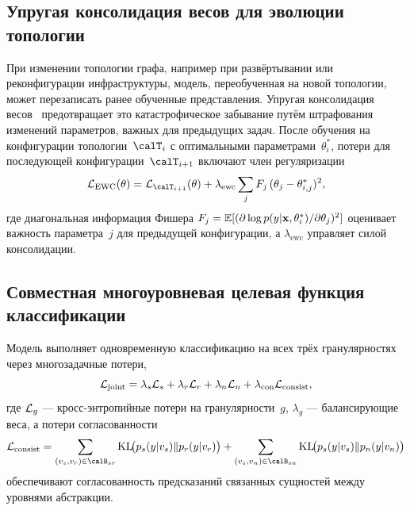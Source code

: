 \subsection{Упругая консолидация весов для эволюции топологии}

При изменении топологии графа, например при развёртывании или реконфигурации инфраструктуры, модель, переобученная на новой топологии, может перезаписать ранее обученные представления. Упругая консолидация весов~\cite{Kirkpatrick2017,Zenke2017} предотвращает это катастрофическое забывание путём штрафования изменений параметров, важных для предыдущих задач. После обучения на конфигурации топологии~$\calT_i$ с оптимальными параметрами~$\theta_i^*$, потери для последующей конфигурации~$\calT_{i+1}$ включают член регуляризации
\begin{equation}
\calL_{\mathrm{EWC}}(\theta)
= \calL_{\calT_{i+1}}(\theta)
  + \lambda_{\mathrm{ewc}}\sum_j F_j\,(\theta_j - \theta_{i,j}^*)^2,
\label{eq:ewc}
\end{equation}
где диагональная информация Фишера $F_j = \mathbb{E}[(\partial\log p(y|\mathbf{x},\theta_i^*)/\partial\theta_j)^2]$ оценивает важность параметра~$j$ для предыдущей конфигурации, а $\lambda_{\mathrm{ewc}}$ управляет силой консолидации.

\subsection{Совместная многоуровневая целевая функция классификации}

Модель выполняет одновременную классификацию на всех трёх гранулярностях через многозадачные потери,
\begin{equation}
\mathcal{L}_{\mathrm{joint}}
= \lambda_s\mathcal{L}_s + \lambda_r\mathcal{L}_r + \lambda_n\mathcal{L}_n
  + \lambda_{\mathrm{con}}\mathcal{L}_{\mathrm{consist}},
\label{eq:triple_joint}
\end{equation}
где $\mathcal{L}_g$ --- кросс-энтропийные потери на гранулярности~$g$, $\lambda_g$ --- балансирующие веса, а потери согласованности
\begin{equation}
\calL_{\mathrm{consist}}
= \sum_{(v_s,v_r)\in\calB_{sr}}
  \mathrm{KL}\!\bigl(p_s(y|v_s)\|p_r(y|v_r)\bigr)
+ \sum_{(v_s,v_n)\in\calB_{sn}}
  \mathrm{KL}\!\bigl(p_s(y|v_s)\|p_n(y|v_n)\bigr)
\label{eq:triple_consist}
\end{equation}
обеспечивают согласованность предсказаний связанных сущностей между уровнями абстракции.

